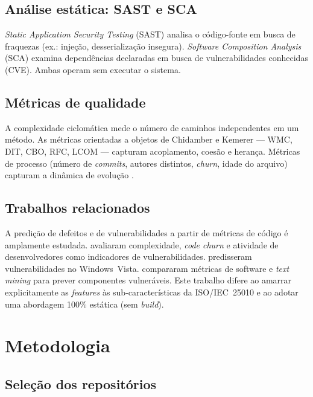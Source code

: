 \documentclass[12pt]{article}
\begin{document}
\subsection{Análise estática: SAST e SCA}
\emph{Static Application Security Testing} (SAST) analisa o código-fonte em
busca de fraquezas (ex.: injeção, desserialização insegura). \emph{Software
Composition Analysis} (SCA) examina dependências declaradas em busca de
vulnerabilidades conhecidas (CVE). Ambas operam sem executar o sistema.

\subsection{Métricas de qualidade}
A complexidade ciclomática \cite{mccabe1976} mede o número de caminhos
independentes em um método. As métricas orientadas a objetos de Chidamber e
Kemerer \cite{ck1994} --- WMC, DIT, CBO, RFC, LCOM --- capturam acoplamento,
coesão e herança. Métricas de processo (número de \textit{commits}, autores
distintos, \textit{churn}, idade do arquivo) capturam a dinâmica de evolução
\cite{spadini2018}.

\subsection{Trabalhos relacionados}
A predição de defeitos e de vulnerabilidades a partir de métricas de código é
amplamente estudada.  avaliaram complexidade, \textit{code
churn} e atividade de desenvolvedores como indicadores de vulnerabilidades.
 predisseram vulnerabilidades no Windows~Vista.
 compararam métricas de software e \textit{text mining}
para prever componentes vulneráveis. Este trabalho difere ao amarrar
explicitamente as \textit{features} às sub-características da ISO/IEC~25010 e ao
adotar uma abordagem 100\% estática (sem \textit{build}).

\section{Metodologia}

\subsection{Seleção dos repositórios}
\end{document}
